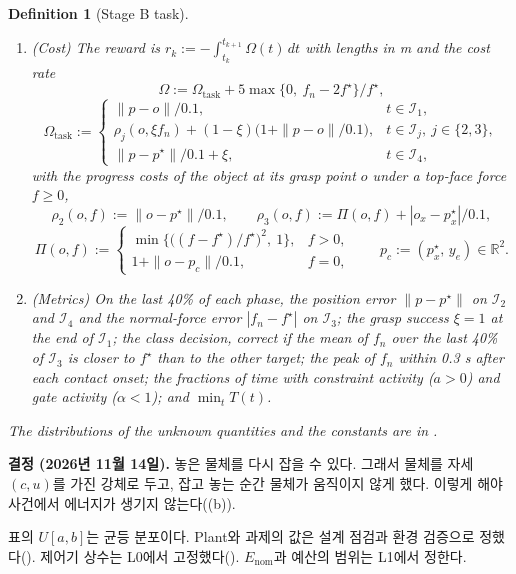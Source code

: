 \documentclass[11pt]{article}\usepackage[margin=1in]{geometry}\usepackage{amsmath,amssymb,amsthm,mathtools}\usepackage{graphicx}\graphicspath{{figures/}{../figures/}{figs/}{./}}\usepackage{enumitem}\usepackage{hyperref}\usepackage{cleveref}\usepackage{tikz}\usetikzlibrary{arrows.meta,positioning,calc,shapes.geometric}\usepackage{float}\usepackage{rotating}\usepackage[most]{tcolorbox}\usepackage{kotex}\usepackage{booktabs}\usepackage{longtable}\emergencystretch=1.6em\tolerance=2000 \crefname{assumption}{Assumption}{Assumptions}\Crefname{assumption}{Assumption}{Assumptions}\crefname{definition}{Definition}{Definitions}\Crefname{definition}{Definition}{Definitions}\crefname{proposition}{Proposition}{Propositions}\Crefname{proposition}{Proposition}{Propositions}\crefname{fact}{Fact}{Facts}\Crefname{fact}{Fact}{Facts} \newtheorem{assumption}{Assumption}\newtheorem{definition}{Definition}\newtheorem{lemma}{Lemma}\newtheorem{proposition}{Proposition}\newtheorem{theorem}{Theorem}\newtheorem{corollary}{Corollary}\newtheorem{fact}{Fact}\theoremstyle{remark}\newtheorem{remark}{Remark} \newcommand{\R}{\mathbb{R}}\newcommand{\xb}{\bar x}\newcommand{\Ab}{\bar A}\newcommand{\By}{\bar B_y}\newcommand{\U}{\mathcal U}\newcommand{\Z}{\mathcal Z}
\begin{document}
\begin{definition}[Stage B task]
\begin{enumerate}[label=(\alph*), start=6]
\item (Cost) The reward is $r_k:=-\int_{t_k}^{t_{k+1}}\Omega(t)\,dt$ with lengths in m and the cost rate
\[
\Omega:=\Omega_{\mathrm{task}}+5\max\{0,\ f_n-2f^\star\}/f^\star,
\]
\[
\Omega_{\mathrm{task}}:=\begin{cases}
\|p-o\|/0.1, & t\in\mathcal I_1,\\
\rho_j(o,\xi f_n)+(1-\xi)\big(1+\|p-o\|/0.1\big), & t\in\mathcal I_j,\ j\in\{2,3\},\\
\|p-p^\star\|/0.1+\xi, & t\in\mathcal I_4,
\end{cases}
\]
with the progress costs of the object at its grasp point $o$ under a top-face force $f\ge0$,
\[
\rho_2(o,f):=\|o-p^\star\|/0.1,\qquad \rho_3(o,f):=\Pi(o,f)+|o_x-p^\star_x|/0.1,
\]
\[
\Pi(o,f):=\begin{cases}\min\big\{\big((f-f^\star)/f^\star\big)^2,\ 1\big\}, & f>0,\\ 1+\|o-p_c\|/0.1, & f=0,\end{cases}\qquad p_c:=(p^\star_x,\,y_e)\in\R^2 .
\]
\item (Metrics) On the last 40\% of each phase, the position error $\|p-p^\star\|$ on $\mathcal I_2$ and $\mathcal I_4$ and the normal-force error $|f_n-f^\star|$ on $\mathcal I_3$; the grasp success $\xi=1$ at the end of $\mathcal I_1$; the class decision, correct if the mean of $f_n$ over the last 40\% of $\mathcal I_3$ is closer to $f^\star$ than to the other target; the peak of $f_n$ within 0.3 s after each contact onset; the fractions of time with constraint activity ($a>0$) and gate activity ($\alpha<1$); and $\min_tT(t)$.
\end{enumerate}
The distributions of the unknown quantities and the constants are in .
\end{definition}

\textbf{결정 (2026년 11월 14일).} 놓은 물체를 다시 잡을 수 있다. 그래서 물체를 자세 $(c,u)$를 가진 강체로 두고, 잡고 놓는 순간 물체가 움직이지 않게 했다. 이렇게 해야 사건에서 에너지가 생기지 않는다((b)).

표의 $U[a,b]$는 균등 분포이다. Plant와 과제의 값은 설계 점검과 환경 검증으로 정했다(). 제어기 상수는 L0에서 고정했다(). $E_{\mathrm{nom}}$과 예산의 범위는 L1에서 정한다.
\end{document}
